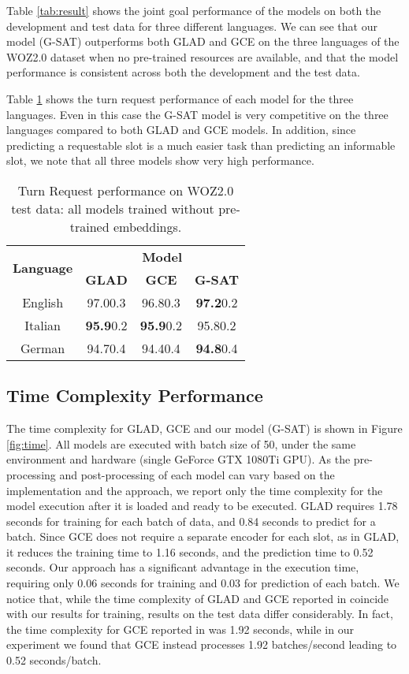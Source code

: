 \documentclass{article}
\begin{document}
Table \ref{tab:result} shows the joint goal performance of the models on both the development and test data for three different languages.
We can see that our model (G-SAT)  outperforms both GLAD and GCE on the three languages of the WOZ2.0 dataset when no pre-trained resources are available, and that the model performance is consistent across both the development and the test data.

Table \ref{tab:req_result} shows the turn request performance of each model for the three languages.
Even in this case the G-SAT model is very competitive on the three languages compared to both GLAD and GCE models.
In addition, since predicting a requestable slot is a much easier task than predicting  an informable slot, we note that all three models show very high performance.

\begin{table}
    \centering
    \begin{tabular}{c|c|c|c}
        \multirow{2}{*}{\textbf{Language}} & \multicolumn{3}{c}{\textbf{Model}}\\
        & \textbf{GLAD} & \textbf{GCE} &\textbf{G-SAT}\\
        \hline
        English & 97.00.3 & 96.80.3 & \textbf{97.2}0.2 \\
        Italian & \textbf{95.9}0.2 & \textbf{95.9}0.2 & 95.80.2 \\
        German & 94.70.4 & 94.40.4 & \textbf{94.8}0.4 \\
    \end{tabular}
    \caption{Turn Request performance on WOZ2.0 test data: all models  trained without pre-trained embeddings.}
    \label{tab:req_result}
\end{table}

\subsection{Time Complexity Performance}
The time complexity for GLAD, GCE and our model (G-SAT) is shown in Figure \ref{fig:time}.
All models are executed with batch size of 50, under the same environment and hardware (single GeForce GTX 1080Ti GPU).
As the pre-processing and post-processing of each model can vary based on the implementation and the approach, we report only the time complexity for the model execution after it is loaded and ready to be executed.
GLAD requires 1.78 seconds for training for each batch of data, and 0.84 seconds to predict for a batch.
Since  GCE  does not require a separate encoder for each slot, as in GLAD, it reduces the training time to 1.16 seconds, and the prediction time to 0.52 seconds.
Our approach has a significant advantage in the execution time, requiring only 0.06 seconds for training and 0.03 for prediction of each batch.
We notice that, while the time complexity of GLAD and GCE  reported in \cite{GCE} coincide with our results for training,  results on the test data differ considerably. In fact, the time complexity for GCE reported in \cite{GCE} was 1.92 seconds, while in our experiment we found that GCE instead processes 1.92 batches/second leading to 0.52 seconds/batch.
\end{document}
